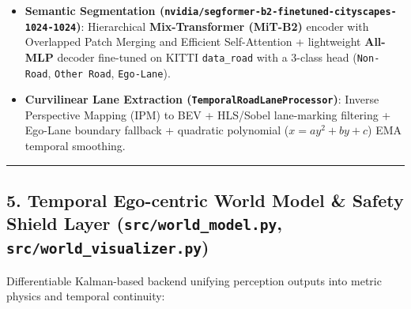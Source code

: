 \documentclass[10.5pt,a4paper]{article}
\begin{document}
\begin{itemize}[leftmargin=1.5em,itemsep=2pt]
\item \textbf{Semantic Segmentation (\texttt{nvidia/\allowbreak{}segformer-\allowbreak{}b2-\allowbreak{}finetuned-\allowbreak{}cityscapes-\allowbreak{}1024-\allowbreak{}1024})}: Hierarchical \textbf{Mix-Transformer (MiT-B2)} encoder with Overlapped Patch Merging and Efficient Self-Attention + lightweight \textbf{All-MLP} decoder fine-tuned on KITTI \texttt{data\_\allowbreak{}road} with a 3-class head (\texttt{Non-\allowbreak{}Road}, \texttt{Other Road}, \texttt{Ego-\allowbreak{}Lane}).
\item \textbf{Curvilinear Lane Extraction (\texttt{TemporalRoadLaneProcessor})}: Inverse Perspective Mapping (IPM) to BEV + HLS/Sobel lane-marking filtering + Ego-Lane boundary fallback + quadratic polynomial ($x = a y^2 + b y + c$) EMA temporal smoothing.
\end{itemize}

\par\noindent\rule{\textwidth}{0.4pt}\par\medskip

\subsection{5. Temporal Ego-centric World Model \& Safety Shield Layer (\texttt{src/\allowbreak{}world\_\allowbreak{}model.\allowbreak{}py}, \texttt{src/\allowbreak{}world\_\allowbreak{}visualizer.\allowbreak{}py})}

Differentiable Kalman-based backend unifying perception outputs into metric physics and temporal continuity:
\end{document}
